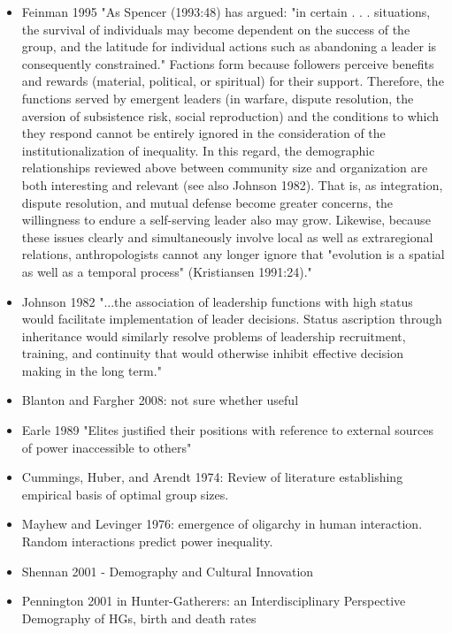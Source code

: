 \documentclass[11pt,oneside,a4paper,onecolumn]{article}
\begin{document}
\begin{itemize}
	\item Feinman 1995 "As Spencer (1993:48) has argued: "in certain . . . situations, the survival of individuals may become dependent on the success of the group, and the latitude for individual actions such as abandoning a leader is consequently constrained." Factions form because followers perceive benefits and rewards (material, political, or spiritual) for their support. Therefore, the functions served by emergent leaders (in warfare, dispute resolution, the aversion of subsistence risk, social reproduction) and the conditions to which they respond cannot be entirely ignored in the consideration of the institutionalization of inequality. In this regard, the demographic relationships reviewed
above between community size and organization are both interesting and relevant (see also Johnson 1982). That is, as integration, dispute resolution, and mutual defense become greater concerns, the willingness to endure a self-serving leader also may grow. Likewise, because these issues clearly and simultaneously involve local as well as extraregional relations, anthropologists cannot any longer ignore that "evolution is a spatial as well as a temporal process" (Kristiansen 1991:24)."

	\item Johnson 1982 "...the association of leadership functions with high status would facilitate implementation of leader decisions. Status ascription through inheritance would similarly resolve problems of leadership recruitment, training, and continuity that would otherwise inhibit effective decision making in the long term."

	\item Blanton and Fargher 2008:  not sure whether useful

	\item Earle 1989 "Elites justified their positions with reference to external sources of power inaccessible to others"

	\item Cummings, Huber, and Arendt 1974:  Review of literature establishing empirical basis of optimal group sizes.

	\item Mayhew and Levinger 1976: emergence of oligarchy in human interaction.  Random interactions predict power inequality.
	
	\item Shennan 2001 - Demography and Cultural Innovation
	
	\item Pennington 2001 in Hunter-Gatherers: an Interdisciplinary Perspective\\
	Demography of HGs, birth and death rates
	

\end{itemize}
\end{document}
